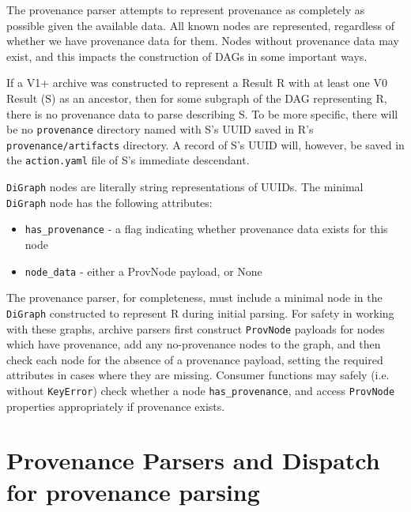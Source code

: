 The provenance parser attempts to represent provenance as completely as possible
given the available data. All known nodes are represented, regardless of whether
we have provenance data for them. Nodes without provenance data may exist, and
this impacts the construction of DAGs in some important ways.

If a V1+ archive was constructed to represent a Result R with at least one V0
Result (S) as an ancestor, then for some subgraph of the DAG representing R,
there is no provenance data to parse describing S. To be more specific, there
will be no \texttt{provenance} directory named with S’s UUID saved in R’s
\texttt{provenance/artifacts} directory. A record of S’s UUID will, however, be saved in
the \texttt{action.yaml} file of S’s immediate descendant.

\texttt{DiGraph} nodes are literally string representations of UUIDs. The minimal \texttt{DiGraph} node has the
following attributes:
\begin{itemize}
    \item \texttt{has\_provenance} - a flag indicating whether provenance data exists for this node
    \item \texttt{node\_data} - either a ProvNode payload, or None
\end{itemize}

The provenance parser, for completeness, must include a minimal node in the
\texttt{DiGraph} constructed to represent R during initial parsing. For safety in working
with these graphs, archive parsers first construct \texttt{ProvNode} payloads for nodes
which have provenance, add any no-provenance nodes to the graph, and then check
each node for the absence of a provenance payload, setting the required
attributes in cases where they are missing. Consumer functions may safely
(i.e. without \texttt{KeyError}) check whether a node \texttt{has\_provenance},
and access \texttt{ProvNode} properties appropriately if provenance exists.

\section{Provenance Parsers and Dispatch for provenance parsing}

